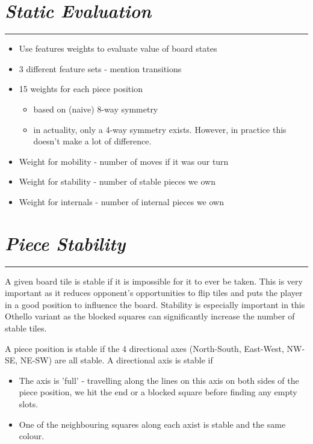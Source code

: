 \documentclass[10pt]{report}
\begin{document}
\begin{multicols}{2}
\section*{\emph{Static Evaluation}}
\hrule
    \begin{itemize}
  \item
    Use features weights to evaluate value of board states
  \item
    3 different feature sets - mention transitions
  \item
    15 weights for each piece position
	\begin{itemize}
		\item based on (naive) 8-way symmetry
		\item in actuality, only a 4-way symmetry exists. However, in practice this doesn't make a lot of difference.
	\end{itemize}
  \item
    Weight for mobility - number of moves if it was our turn
  \item
   Weight for stability - number of stable pieces we own
  \item
   Weight for internals - number of internal pieces we own
  \end{itemize}

\section*{\emph{\textmd{Piece Stability}}}
\hrule

A given board tile is stable if it is impossible for it to ever be taken. This is very important as it reduces opponent's opportunities to flip tiles and puts the player in a good position to influence the board. Stability is especially important in this Othello variant as the blocked squares can significantly increase the number of stable tiles. 

A piece position is stable if the 4 directional axes (North-South, East-West, NW-SE, NE-SW) are all stable. A directional axis is stable if
    \begin{itemize}
\item The axis is 'full' - travelling along the lines on this axis on both sides of the piece position, we hit the end or a blocked square before finding any empty slots.
\item One of the neighbouring squares along each axist is stable and the same colour.
\end{itemize}


\end{multicols}
\end{document}
